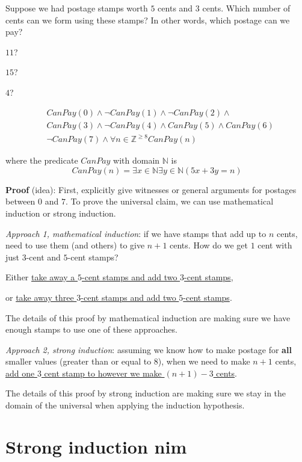 \documentclass[12pt, oneside]{article}
\begin{document}
Suppose we had postage stamps worth $5$ cents and $3$ cents.
Which number of cents can we form using these stamps?
In other words, which postage can we pay?

$11$? 

$15$? 


$4$?



\begin{align*}
    &CanPay(0) \land \lnot CanPay(1) \land \lnot CanPay(2) \land \\
    &CanPay(3) \land \lnot CanPay(4) \land CanPay(5) \land CanPay(6) \\
    &\lnot CanPay(7) \land \forall n \in \mathbb{Z}^{\geq 8} CanPay(n)
\end{align*}

where the predicate $CanPay$ with domain $\mathbb{N}$ is
\[
    CanPay(n) = \exists x \in \mathbb{N} \exists y \in \mathbb{N}  ( 5x+3y = n)
\]


{\bf Proof} (idea): First, explicitly give witnesses or general arguments
for postages between $0$ and $7$. 
To prove the universal claim, we can use mathematical induction or strong induction.

{\it Approach 1, mathematical induction}: if we have
stamps that add up to $n$ cents, need to use them (and others)
to give $n+1$ cents. How do we get $1$ cent with just $3$-cent
and $5$-cent stamps?

\vspace{-10pt}
Either \underline{take away a $5$-cent stamps and add two $3$-cent stamps},

\vspace{-10pt}
or \underline{take away three $3$-cent stamps and add two $5$-cent stamps}.

\vspace{-10pt}
The details of this proof by mathematical induction
are making sure we have enough 
stamps to use one of these approaches.

{\it Approach 2, strong induction}: assuming we know how to make postage
for {\bf all} smaller values (greater than or equal to $8$), when
we need to make $n+1$ cents, \underline{add one $3$ cent stamp to 
however we make $(n+1) - 3$ cents}.

\vspace{-10pt}
The details of this proof by strong induction are making sure we 
stay in the domain of the universal when applying the induction hypothesis.
 \vfill
\section*{Strong induction nim}
\end{document}
